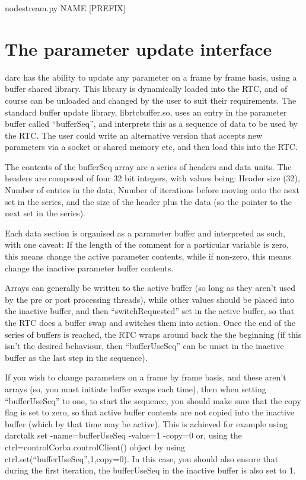 \documentclass[a4,10pt]{article}
\begin{document}
nodestream.py NAME [PREFIX]




\section{The parameter update interface}
darc has the ability to update any parameter on a frame by frame
basis, using a buffer shared library.  This library is dynamically
loaded into the RTC, and of course can be unloaded and changed by the
user to suit their requirements.  The standard buffer update library,
librtcbuffer.so, uses an entry in the parameter buffer called
``bufferSeq'', and interprets this as a sequence of data to be used by
the RTC.  The user could write an alternative version that accepts new
parameters via a socket or shared memory etc, and then load this into
the RTC.

The contents of the bufferSeq array are a series of headers and data
units.  The headers are composed of four 32 bit integers, with values
being: Header size (32), Number of entries in the data, Number of
iterations before moving onto the next set in the series, and the size
of the header plus the data (so the pointer to the next set in the
series).

Each data section is organised as a parameter buffer and interpreted
as such, with one caveat:  If the length of the comment for a
particular variable is zero, this means change the active parameter
contents, while if non-zero, this means change the inactive parameter
buffer contents.

Arrays can generally be written to the active buffer (so long as they
aren't used by the pre or post processing threads), while other values
should be placed into the inactive buffer, and then
``switchRequested'' set in the active buffer, so that the RTC does a
buffer swap and switches them into action.  Once the end of the series
of buffers is reached, the RTC wraps around back the the beginning (if
this isn't the desired behaviour, then ``bufferUseSeq'' can be unset
in the inactive buffer as the last step in the sequence).  

If you wish to change parameters on a frame by frame basis, and these
aren't arrays (so, you must initiate buffer swaps each time), then
when setting ``bufferUseSeq'' to one, to start the sequence, you
should make sure that the copy flag is set to zero, so that active
buffer contents are not copied into the inactive buffer (which by that
time may be active).  This is achieved for example using
{\rm darctalk set -name=bufferUseSeq -value=1 -copy=0}  or, using the
{\rm ctrl=controlCorba.controlClient()} object by using {\rm
  ctrl.set(``bufferUseSeq'',1,copy=0)}.  In this case, you should also
ensure that during the first iteration, the bufferUseSeq in the
inactive buffer is also set to 1.
\end{document}
